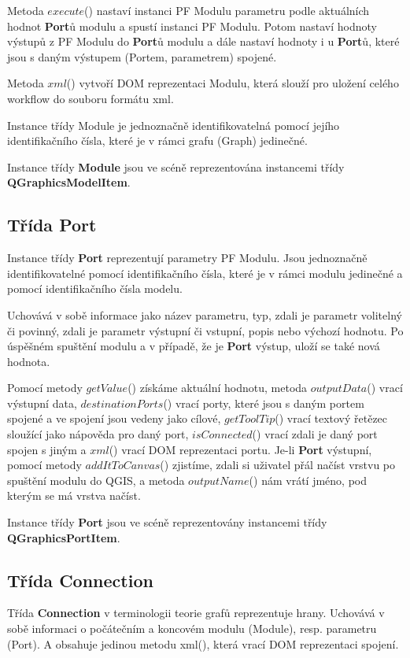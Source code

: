 Metoda $execute$() nastaví instanci PF Modulu parametru podle aktuálních hodnot \textbf{Port}ů modulu a spustí instanci PF Modulu. Potom nastaví hodnoty výstupů z PF Modulu do \textbf{Port}ů modulu a dále nastaví hodnoty i u \textbf{Port}ů, které jsou s daným výstupem (Portem, parametrem) spojené. 

Metoda $xml$() vytvoří DOM reprezentaci Modulu, která slouží pro uložení celého workflow do souboru formátu xml.

Instance třídy Module je jednoznačně identifikovatelná pomocí jejího identifikačního čísla, které je v rámci grafu (Graph) jedinečné.

Instance třídy \textbf{Module} jsou ve scéně reprezentována instancemi třídy \textbf{QGraphicsModelItem}.

\subsection*{Třída Port}  
Instance třídy \textbf{Port} reprezentují parametry PF Modulu. Jsou jednoznačně identifikovatelné pomocí identifikačního čísla, které je v rámci modulu jedinečné a pomocí identifikačního čísla modelu.

Uchovává v sobě informace jako název parametru, typ, zdali je parametr volitelný či povinný, zdali je parametr výstupní či vstupní, popis nebo výchozí hodnotu. Po úspěšném spuštění modulu a v případě, že je \textbf{Port} výstup, uloží se také nová hodnota.

Pomocí metody $getValue$() získáme aktuální hodnotu, metoda $outputData$() vrací výstupní data, $destinationPorts$() vrací porty, které jsou s daným portem spojené a ve spojení jsou vedeny jako cílové, $getToolTip$() vrací textový řetězec sloužící jako nápověda pro daný port, $isConnected$() vrací zdali je daný port spojen s jiným a $xml$() vrací DOM reprezentaci portu. Je-li \textbf{Port} výstupní, pomocí metody $addItToCanvas$() zjistíme, zdali si uživatel přál načíst vrstvu po spuštění modulu do QGIS, a metoda $outputName$() nám vrátí jméno, pod kterým se má vrstva načíst.

Instance třídy \textbf{Port} jsou ve scéně reprezentovány instancemi třídy \textbf{QGraphicsPortItem}.

\subsection*{Třída Connection}
Třída \textbf{Connection} v terminologii teorie grafů reprezentuje hrany. Uchovává v sobě informaci o počátečním a koncovém modulu (Module), resp. parametru (Port). A obsahuje jedinou metodu xml(), která vrací DOM reprezentaci spojení.

